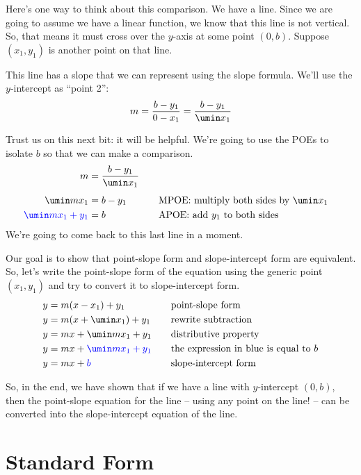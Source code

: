 Here's one way to think about this comparison. We have a line. Since we are going to assume we have a linear function, we know that this line is not vertical. So, that means it must cross over the $y$-axis at some point $(0,b)$. Suppose $(x_1, y_1)$ is another point on that line. 

This line has a slope that we can represent using the slope formula. We'll use the $y$-intercept as ``point 2'': \[m = \frac{b-y_1}{0-x_1} = \frac{b-y_1}{\umin x_1}\]

Trust us on this next bit: it will be helpful. We're going to use the POEs to isolate $b$ so that we can make a comparison.
\[\begin{aligned}
m &= \frac{b-y_1}{\umin x_1}\\[1ex]
\umin mx_1 &= b-y_1
&&\quad\text{MPOE: multiply both sides by $\umin x_1$}\\
{\color{blue}\umin mx_1 + y_1} &= b
&&\quad\text{APOE: add $y_1$ to both sides}\\
\end{aligned}\]
We're going to come back to this last line in a moment.

Our goal is to show that point-slope form and slope-intercept form are equivalent. So, let's write the point-slope form of the equation using the generic point $(x_1,y_1)$ and try to convert it to slope-intercept form.
\[\begin{aligned}
y &= m(x-x_1) + y_1
&&\quad\text{point-slope form}\\
y &= m(x+ \umin x_1) + y_1
&&\quad\text{rewrite subtraction}\\
y &= mx + \umin mx_1 + y_1
&&\quad\text{distributive property}\\
y &= mx + {\color{blue} \umin mx_1 + y_1}
&&\quad\text{the expression in blue is equal to $b$}\\
y &= mx + {\color{blue} b}
&&\quad\text{slope-intercept form}
\end{aligned}\]

So, in the end, we have shown that if we have a line with $y$-intercept $(0,b)$, then the point-slope equation for the line -- using any point on the line! -- can be converted into the slope-intercept equation of the line.

\section{Standard Form}
\label{sec:standardform}

